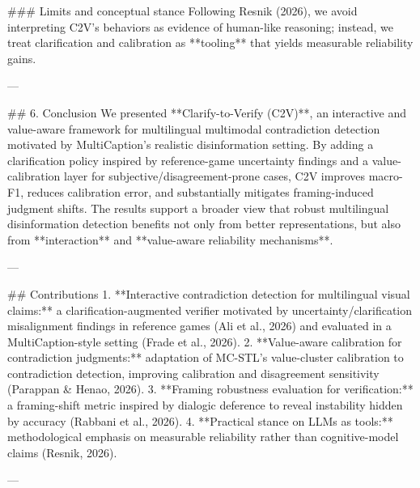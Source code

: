 ### Limits and conceptual stance  
Following Resnik (2026), we avoid interpreting C2V’s behaviors as evidence of human-like reasoning; instead, we treat clarification and calibration as **tooling** that yields measurable reliability gains.

---

## 6. Conclusion  
We presented **Clarify-to-Verify (C2V)**, an interactive and value-aware framework for multilingual multimodal contradiction detection motivated by MultiCaption’s realistic disinformation setting. By adding a clarification policy inspired by reference-game uncertainty findings and a value-calibration layer for subjective/disagreement-prone cases, C2V improves macro-F1, reduces calibration error, and substantially mitigates framing-induced judgment shifts. The results support a broader view that robust multilingual disinformation detection benefits not only from better representations, but also from **interaction** and **value-aware reliability mechanisms**.

---

## Contributions  
1. **Interactive contradiction detection for multilingual visual claims:** a clarification-augmented verifier motivated by uncertainty/clarification misalignment findings in reference games (Ali et al., 2026) and evaluated in a MultiCaption-style setting (Frade et al., 2026).  
2. **Value-aware calibration for contradiction judgments:** adaptation of MC-STL’s value-cluster calibration to contradiction detection, improving calibration and disagreement sensitivity (Parappan & Henao, 2026).  
3. **Framing robustness evaluation for verification:** a framing-shift metric inspired by dialogic deference to reveal instability hidden by accuracy (Rabbani et al., 2026).  
4. **Practical stance on LLMs as tools:** methodological emphasis on measurable reliability rather than cognitive-model claims (Resnik, 2026).

---